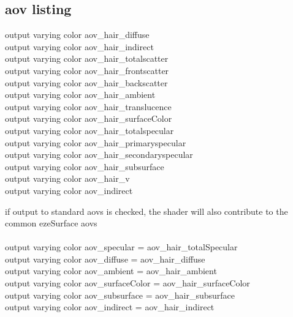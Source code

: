 \documentclass[final,letterpaper,twoside,12pt]{report}
\begin{document}
\subsection {aov listing}
output varying color aov\_hair\_diffuse\\
output varying color aov\_hair\_indirect\\
output varying color aov\_hair\_totalscatter\\
output varying color aov\_hair\_frontscatter\\
output varying color aov\_hair\_backscatter\\
output varying color aov\_hair\_ambient\\
output varying color aov\_hair\_translucence\\
output varying color aov\_hair\_surfaceColor\\
output varying color aov\_hair\_totalspecular\\
output varying color aov\_hair\_primaryspecular\\
output varying color aov\_hair\_secondaryspecular\\
output varying color aov\_hair\_subsurface\\
output varying color aov\_hair\_v\\
output varying color aov\_indirect\\
\smallskip

\noindent if output to standard aovs is checked, the shader will also contribute to the common ezeSurface aovs\\
\\
    output varying color aov\_specular = aov\_hair\_totalSpecular\\
    output varying color aov\_diffuse = aov\_hair\_diffuse\\ 
    output varying color aov\_ambient = aov\_hair\_ambient\\
    output varying color aov\_surfaceColor = aov\_hair\_surfaceColor\\
    output varying color aov\_subsurface = aov\_hair\_subsurface\\
    output varying color aov\_indirect = aov\_hair\_indirect\\



\end{document}
